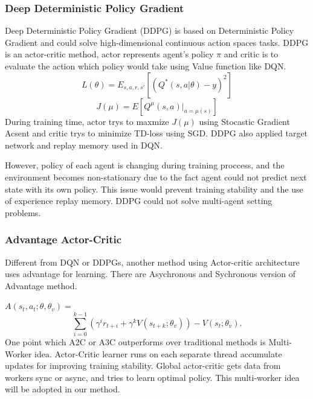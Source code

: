 \documentclass[11pt,twocolumn]{jarticle} %
\begin{document}
\subsubsection{Deep Deterministic Policy Gradient}
Deep Deterministic Policy Gradient (DDPG) \cite{ddpg} is based on Deterministic Policy Gradient \cite{dpg} and could solve high-dimensional continuous action spaces tasks. DDPG is an actor-critic method, actor represents agent's policy $\pi$ and critic is to evaluate the action which policy would take using Value function like DQN. 
\begin{equation}
L(\theta) = E_{s,a,r,s'}[(Q^*(s, a|\theta) - y)^2] 
\end{equation}
\begin{equation}
J(\mu) = E[Q^\mu(s, a) | _{a=\mu(s)}]
\end{equation}
During training time, actor trys to maxmize $J(\mu)$ using Stocastic Gradient Acsent and critic trys to minimize TD-loss using SGD. DDPG also applied target network and replay memory used in DQN. \par
However, policy of each agent is changing during training proccess, and the environment becomes non-stationary due to the fact agent could not predict next state with its own policy. This issue would prevent training stability and the use of experience replay memory. DDPG could not solve multi-agent setting problems.

\subsubsection{Advantage Actor-Critic}
Different from DQN or DDPGs, another method using Actor-critic architecture uses advantage for learning. 
There are Asychronous \cite{a3c} and Sychronous \cite{a2c} version of Advantage method.\par
$A(s_t, a_t; \theta, \theta_v) = $ 
\begin{equation}
\sum_{i=0}^{k-1}(\gamma^i r_{t+i} + \gamma^k V(s_{t+k};\theta_v)) - V(s_t; \theta_v).
\end{equation}
One point which A2C or A3C outperforms over traditional methods is Multi-Worker idea. Actor-Critic learner runs on each separate thread accumulate updates for improving training stability. Global actor-critic gets data from workers sync or async, and tries to learn optimal policy. This multi-worker idea will be adopted in our method.
\end{document}
